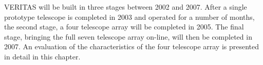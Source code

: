 VERITAS will be built in three stages between 2002 and 2007. After a
single prototype telescope is completed in 2003 and operated for a
number of months, the second stage, a four telescope array will be
completed in 2005. The final stage, bringing the full seven telescope
array on-line, will then be completed in 2007. An evaluation of the
characteristics of the four telescope array is presented in detail in
this chapter.

\begin{figure}[t]
\begin{minipage}[c][0.27\textheight][c]{\textwidth}
\hspace*{\fill}
\hspace*{\fill}

\end{minipage}
\end{figure}
